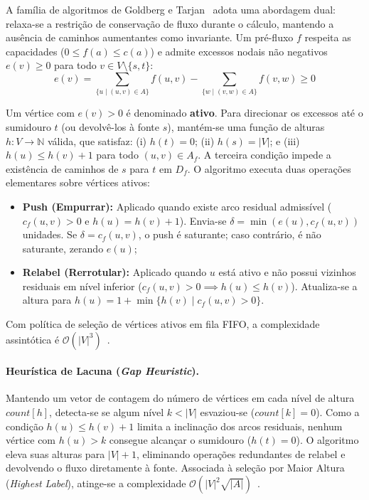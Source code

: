 A família de algoritmos de Goldberg e Tarjan~\cite{goldberg1988new} adota uma abordagem dual: relaxa-se a restrição de conservação de fluxo durante o cálculo, mantendo a ausência de caminhos aumentantes como invariante. Um pré-fluxo $f$ respeita as capacidades ($0 \le f(a) \le c(a)$) e admite excessos nodais não negativos $e(v) \ge 0$ para todo $v \in V \setminus \{s, t\}$:
\begin{equation}
    e(v) = \sum_{\{u \mid (u, v) \in A\}} f(u, v) - \sum_{\{w \mid (v, w) \in A\}} f(v, w) \ge 0
\end{equation}

Um vértice com $e(v) > 0$ é denominado \textbf{ativo}. Para direcionar os excessos até o sumidouro $t$ (ou devolvê-los à fonte $s$), mantém-se uma função de alturas $h: V \to \mathbb{N}$ válida, que satisfaz: (i) $h(t) = 0$; (ii) $h(s) = |V|$; e (iii) $h(u) \le h(v) + 1$ para todo $(u, v) \in A_f$. A terceira condição impede a existência de caminhos de $s$ para $t$ em $D_f$. O algoritmo executa duas operações elementares sobre vértices ativos:
\begin{itemize}
    \item \textbf{Push (Empurrar):} Aplicado quando existe arco residual admissível ($c_f(u, v) > 0$ e $h(u) = h(v) + 1$). Envia-se $\delta = \min(e(u), c_f(u, v))$ unidades. Se $\delta = c_f(u, v)$, o push é saturante; caso contrário, é não saturante, zerando $e(u)$;
    \item \textbf{Relabel (Rerrotular):} Aplicado quando $u$ está ativo e não possui vizinhos residuais em nível inferior ($c_f(u, v) > 0 \implies h(u) \le h(v)$). Atualiza-se a altura para $h(u) = 1 + \min \{h(v) \mid c_f(u, v) > 0\}$.
\end{itemize}

Com política de seleção de vértices ativos em fila FIFO, a complexidade assintótica é $\mathcal{O}(|V|^3)$~\cite{goldberg1988new}.

\paragraph{Heurística de Lacuna (\textit{Gap Heuristic}).} Mantendo um vetor de contagem do número de vértices em cada nível de altura $count[h]$, detecta-se se algum nível $k < |V|$ esvaziou-se ($count[k] = 0$). Como a condição $h(u) \le h(v) + 1$ limita a inclinação dos arcos residuais, nenhum vértice com $h(u) > k$ consegue alcançar o sumidouro ($h(t) = 0$). O algoritmo eleva suas alturas para $|V| + 1$, eliminando operações redundantes de relabel e devolvendo o fluxo diretamente à fonte. Associada à seleção por Maior Altura (\textit{Highest Label}), atinge-se a complexidade $\mathcal{O}(|V|^2 \sqrt{|A|})$~\cite{goldberg1988new}.

